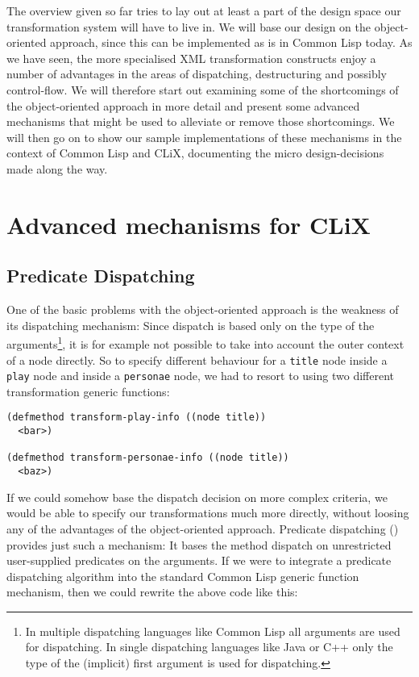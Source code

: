 \documentclass[a4paper,11pt]{scrartcl}
\begin{document}
The overview given so far tries to lay out at least a part of the
design space our transformation system will have to live in.  We will
base our design on the object-oriented approach, since this can be
implemented as is in Common Lisp today.  As we have seen, the more
specialised XML transformation constructs enjoy a number of advantages
in the areas of dispatching, destructuring and possibly control-flow.
We will therefore start out examining some of the shortcomings of the
object-oriented approach in more detail and present some advanced
mechanisms that might be used to alleviate or remove those
shortcomings.  We will then go on to show our sample implementations
of these mechanisms in the context of Common Lisp and CLiX,
documenting the micro design-decisions made along the way. 



\section{Advanced mechanisms for CLiX}
\label{sec:mechanisms}


\subsection{Predicate Dispatching}
\label{sec:predicate-dispatching}

One of the basic problems with the object-oriented approach is the
weakness of its dispatching mechanism:  Since dispatch is based only
on the type of the arguments\footnote{In multiple dispatching
  languages like Common Lisp all arguments are used for dispatching.
  In single dispatching languages like Java or C++ only the type of
  the (implicit) first argument is used for dispatching.}, it is for
example not possible to take into account the outer context of a node
directly.  So to specify different behaviour for a \texttt{title} node
inside a \texttt{play} node and inside a \texttt{personae} node, we
had to resort to using two different transformation generic functions:

\begin{verbatim}
(defmethod transform-play-info ((node title))
  <bar>)

(defmethod transform-personae-info ((node title))
  <baz>)
\end{verbatim}

If we could somehow base the dispatch decision on more complex
criteria, we would be able to specify our transformations much more
directly, without loosing any of the advantages of the object-oriented
approach.  Predicate dispatching (\cite{UNI,PRED}) provides just such
a mechanism:  It bases the method dispatch on unrestricted user-supplied
predicates on the arguments.  If we were to integrate a predicate
dispatching algorithm into the standard Common Lisp generic function
mechanism, then we could rewrite the above code like this:
\end{document}

